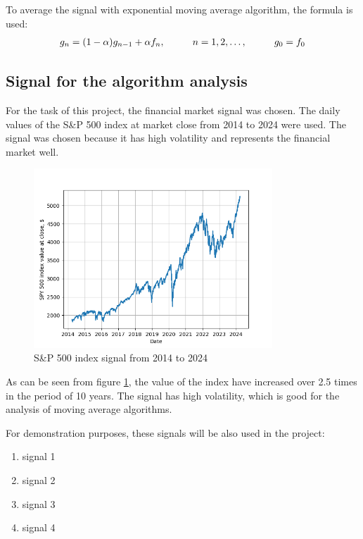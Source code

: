 \documentclass[a4paper,12pt,fleqn]{article}
\begin{document}
        To average the signal with exponential moving average algorithm, 
        the formula is used: \begin{gather}
            g_n = (1-\alpha) g_{n-1} + \alpha f_n, \hspace{1 cm} n = 1, 2, \dots , \hspace{1 cm} g_0 = f_0
        \end{gather}
        
        \subsection{Signal for the algorithm analysis}
        \hspace{1em}For the task of this project, the financial market signal was chosen. The daily values of 
        the S\&P 500 index\cite{SP500} at market close from 2014 to 2024 were used. The signal was chosen because it has
         high volatility and represents the financial market well. 


        \begin{figure}[ht]
            \centering
            \includegraphics[width=0.8\textwidth]{images/SP500.png} %
            \caption{S\&P 500 index signal from 2014 to 2024}
            \label{fig:SP500}
        \end{figure}

        As can be seen from figure \ref{fig:SP500}, the value of the index have increased over 2.5 times in the
        period of 10 years. The signal has high volatility, which is good for the analysis of moving average algorithms.
        
        For demonstration purposes, these signals will be also used in the project:
        \begin{enumerate}
            \item signal 1
            \item signal 2
            \item signal 3
            \item signal 4
        \end{enumerate}
        
\end{document}
